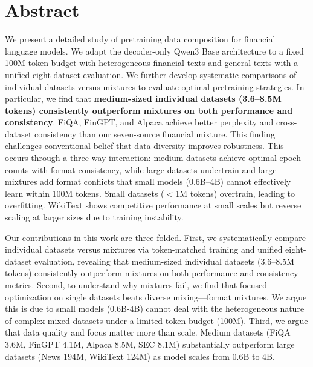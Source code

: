\documentclass[11pt,a4paper,english,oneside]{book}
\begin{document}
\thispagestyle{empty}
\titleGP

\newpage

\setcounter{page}{1}

\section*{Abstract}
\thispagestyle{firststyle}

We present a detailed study of pretraining data composition for financial language models. We adapt the decoder-only Qwen3 Base architecture to a fixed 100M-token budget with heterogeneous financial texts and general texts with a unified eight-dataset evaluation. We further develop systematic comparisons of individual datasets versus mixtures to evaluate optimal pretraining strategies. In particular, we find that \textbf{medium-sized individual datasets (3.6–8.5M tokens) consistently outperform mixtures on both performance and consistency}. FiQA, FinGPT, and Alpaca achieve better perplexity and cross-dataset consistency than our seven-source financial mixture. This finding challenges conventional belief that data diversity improves robustness. This occurs through a three-way interaction: medium datasets achieve optimal epoch counts with format consistency, while large datasets undertrain and large mixtures add format conflicts that small models (0.6B–4B) cannot effectively learn within 100M tokens. Small datasets ($<$1M tokens) overtrain, leading to overfitting. WikiText shows competitive performance at small scales but reverse scaling at larger sizes due to training instability.

Our contributions in this work are three-folded. First, we systematically compare individual datasets versus mixtures via token-matched training and unified eight-dataset evaluation, revealing that medium-sized individual datasets (3.6–8.5M tokens) consistently outperform mixtures on both performance and consistency metrics. Second, to understand why mixtures fail, we find that focused optimization on single datasets beats diverse mixing—format mixtures. We argue this is due to small models (0.6B-4B) cannot deal with the heterogeneous nature of complex mixed datasets under a limited token budget (100M). Third, we argue that data quality and focus matter more than scale. Medium datasets (FiQA 3.6M, FinGPT 4.1M, Alpaca 8.5M, SEC 8.1M) substantially outperform large datasets (News 194M, WikiText 124M) as model scales from 0.6B to 4B.
\end{document}
